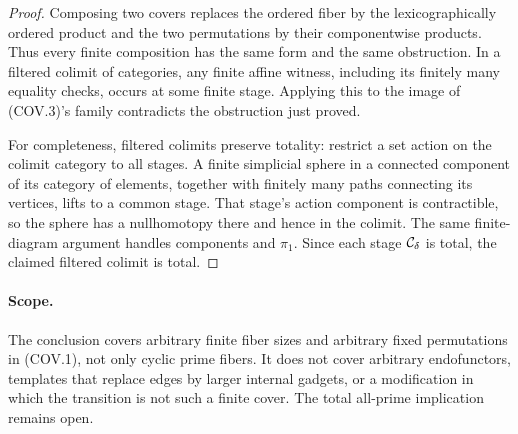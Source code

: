\begin{proof}
Composing two covers replaces the ordered fiber by the
lexicographically ordered product and the two permutations
by their componentwise products. Thus every finite
composition has the same form and the same obstruction.
In a filtered colimit of categories, any finite affine
witness, including its finitely many equality checks,
occurs at some finite stage. Applying this to the image
of (COV.3)'s family contradicts the obstruction just proved.

For completeness, filtered colimits preserve totality:
restrict a set action on the colimit category to all stages.
A finite simplicial sphere in a connected component of its
category of elements, together with finitely many paths
connecting its vertices, lifts to a common stage. That
stage's action component is contractible, so the sphere
has a nullhomotopy there and hence in the colimit.
The same finite-diagram argument handles components and
$\pi_1$. Since each stage $\mathcal C_\delta$ is total, the claimed
filtered colimit is total.
\end{proof}

\paragraph{Scope.}
The conclusion covers arbitrary finite fiber sizes and
arbitrary fixed permutations in (COV.1), not only cyclic
prime fibers. It does not cover arbitrary endofunctors,
templates that replace edges by larger internal gadgets,
or a modification in which the transition is not such a
finite cover. The total all-prime implication remains open.
